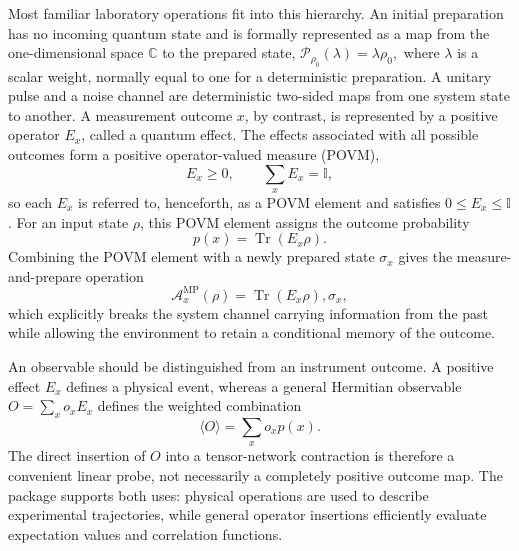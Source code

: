 Most familiar laboratory operations fit into this hierarchy.
An initial preparation has no incoming quantum state and is formally represented as a map from the one-dimensional space \(\mathbb C\) to the prepared state, $\mathcal P_{\rho_0}(\lambda)=\lambda\rho_0,$ where \(\lambda\) is a scalar weight, normally equal to one for a deterministic preparation.
A unitary pulse and a noise channel are deterministic two-sided maps from one system state to another.
A measurement outcome \(x\), by contrast, is represented by a positive operator \(E_x\), called a quantum effect.
The effects associated with all possible outcomes form a positive operator-valued measure (POVM),
%
\begin{equation}
    E_x\geq0, \qquad \sum_x E_x=\mathbb I,
\end{equation}
%
so each \(E_x\) is referred to, henceforth, as a POVM element and satisfies \(0\leq E_x\leq\mathbb I\).
For an input state \(\rho\), this POVM element assigns the outcome probability
%
\[
p(x)=\operatorname{Tr}(E_x\rho).
\]
%
Combining the POVM element with a newly prepared state \(\sigma_x\) gives the measure-and-prepare operation
%
\begin{equation}
    \mathcal A_x^{\mathrm{MP}}(\rho)
    = \operatorname{Tr}(E_x\rho),\sigma_x,
    \label{eq:measure-and-prepare}
\end{equation}
%
which explicitly breaks the system channel carrying information from the past while allowing the environment to retain a conditional memory of the outcome.

An observable should be distinguished from an instrument outcome.
A positive effect \(E_x\) defines a physical event, whereas a general Hermitian observable \(O=\sum_x o_xE_x\) defines the weighted combination
%
\begin{equation}
    \langle O\rangle=\sum_x o_xp(x).
    \label{eq:observable-from-outcomes}
\end{equation}
%
The direct insertion of \(O\) into a tensor-network contraction is therefore a convenient linear probe, not necessarily a completely positive outcome map.
The package supports both uses: physical operations are used to describe experimental trajectories, while general operator insertions efficiently evaluate expectation values and correlation functions.

